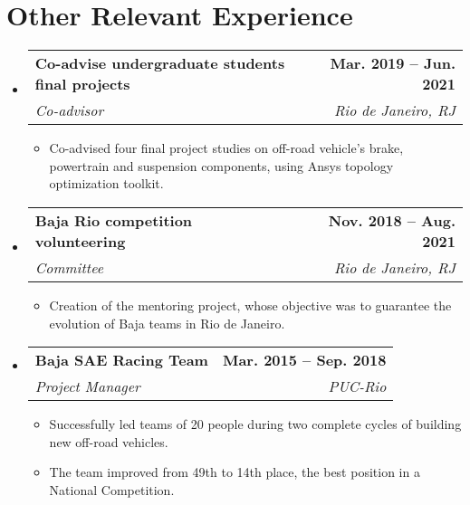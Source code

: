 \documentclass[letterpaper,11pt]{article}
\makeatletter
\newcommand{\resumeItem}[1]{
  \item\small{
    {#1 \vspace{-2pt}}
  }
}
\newcommand{\resumeSubheading}[4]{
  \vspace{-2pt}\item
    \begin{tabular*}{1.0\textwidth}[t]{l@{\extracolsep{\fill}}r}
      \textbf{#1} & \textbf{\small #2} \\
      \textit{\small#3} & \textit{\small #4} \\
    \end{tabular*}\vspace{-7pt}
}
\newcommand{\resumeSubHeadingListStart}{\begin{itemize}[leftmargin=0.0in, label={}]}
\newcommand{\resumeSubHeadingListEnd}{\end{itemize}}
\newcommand{\resumeItemListStart}{\begin{itemize}}
\newcommand{\resumeItemListEnd}{\end{itemize}\vspace{-5pt}}
\makeatother
\begin{document}
\section{Other Relevant Experience}
\resumeSubHeadingListStart
\justifying

\resumeSubheading
{Co-advise undergraduate students final projects}{Mar. 2019 -- Jun. 2021}
{Co-advisor}{Rio de Janeiro, RJ}
\resumeItemListStart
\resumeItem{Co-advised four final project studies on off-road vehicle’s brake, powertrain and suspension components, using Ansys topology optimization toolkit.}
\resumeItemListEnd

\resumeSubheading
{Baja Rio competition volunteering}{Nov. 2018 -- Aug. 2021}
{Committee}{Rio de Janeiro, RJ}
\resumeItemListStart
\resumeItem{Creation of the mentoring project, whose objective was to guarantee the evolution of Baja teams in Rio de Janeiro.}
\resumeItemListEnd

\resumeSubheading{Baja SAE Racing Team}{Mar. 2015 -- Sep. 2018}{Project Manager}{PUC-Rio}
\resumeItemListStart
\resumeItem{Successfully led teams of 20 people during two complete cycles of building new off-road vehicles.}
\resumeItem{The team improved from 49th to 14th place, the best position in a National Competition.}
\resumeItemListEnd

\resumeSubHeadingListEnd
\vspace{-16pt}
\end{document}
